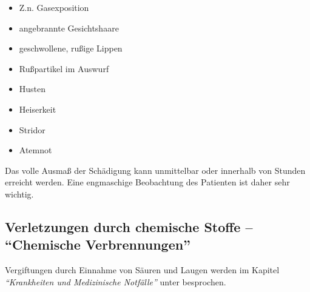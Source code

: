 \begin{itemize}
  \item Z.n. Gasexposition
  \item angebrannte Gesichtshaare
  \item geschwollene, rußige Lippen
  \item Rußpartikel im Auswurf
  \item Husten
  \item Heiserkeit
  \item Stridor
  \item Atemnot
\end{itemize}

Das volle Ausmaß der Schädigung kann unmittelbar oder
innerhalb von Stunden erreicht werden. Eine engmaschige
Beobachtung des Patienten ist daher sehr wichtig.











\subsection{Verletzungen durch chemische Stoffe -- "`Chemische Verbrennungen"'}
\label{topic:veraetzung-trauma}

Vergiftungen durch Einnahme von Säuren und Laugen werden im
Kapitel \emph{"`Krankheiten und Medizinische Notfälle"'}
unter  besprochen. 

